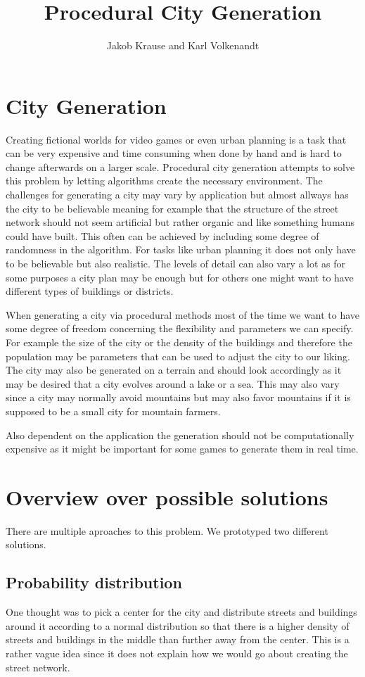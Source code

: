 \documentclass{scrartcl}
\title{Procedural City Generation}
\author{Jakob Krause and Karl Volkenandt}
\begin{document}
\maketitle
\tableofcontents
\newpage


\section{City Generation}
Creating fictional worlds for video games or even urban planning is a task that
can be very expensive and time consuming when done by hand and is hard to change
afterwards on a larger scale.
Procedural city generation attempts to solve this problem by letting algorithms
create the necessary environment. The challenges for generating a city may vary
by application but almost allways has the city to be believable
meaning for example that the structure of the street network should not seem
artificial but rather organic and like something humans could have built.
This often can be achieved by including some degree of randomness in the algorithm.
For tasks like urban planning it does not only have to be believable but also
realistic. The levels of detail can also vary a lot as for some purposes a
city plan may be enough but for others one might want to have different types of
buildings or districts.

When generating a city via procedural methods most of the time we want to have
some degree of freedom concerning the flexibility and parameters we can specify.
For example the size of the city or the density of the buildings and therefore the
population may be parameters that can be used to adjust the city to our liking.
The city may also be generated on a terrain and should look accordingly as it
may be desired that a city evolves around a lake or a sea. This may also vary
since a city may normally avoid mountains but may also favor mountains if it is
supposed to be a small city for mountain farmers.

Also dependent on the application the generation should not be computationally
expensive as it might be important for some games to generate them in real time.




\section{Overview over possible solutions}
There are multiple aproaches to this problem. We prototyped two different solutions.

\subsection{Probability distribution}
One thought was to pick a center for the city and distribute streets and buildings
around it according to a normal distribution so that there is a higher density of streets
and buildings in the middle than further away from the center. This is a rather vague
idea since it does not explain how we would go about creating the street network.
\end{document}
